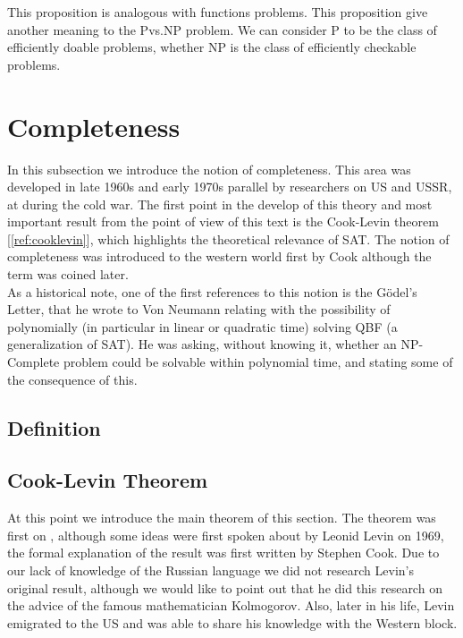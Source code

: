 This proposition is analogous with functions problems. This proposition give another meaning to the Pvs.NP problem. We can consider P to be the class of efficiently doable problems, whether NP is the class of efficiently checkable problems.




\section{Completeness}

In this subsection we introduce the notion of completeness. This area was developed in late 1960s and early 1970s parallel by researchers on US and USSR, at during the cold war. The first point in the develop of this theory and most important result from the point of view of this text is the Cook-Levin theorem [\ref{ref:cooklevin}], which highlights the theoretical relevance of SAT. The notion of completeness was introduced to the western world first by Cook \cite{cook1971complexity} although the term was coined later. \\

As a historical note, one of the first references to this notion is the Gödel's Letter\cite{hartmanis1993godel}, that he wrote to Von Neumann relating with the possibility of polynomially (in particular in linear or quadratic time) solving QBF (a generalization of SAT). He was asking, without knowing it, whether an NP-Complete problem could be solvable within polynomial time, and stating some of the consequence of this.\\



\subsection{Definition}



\subsection{Cook-Levin Theorem}
At this point we introduce the main theorem of this section. The theorem was first on \cite{cook1971complexity}, although some ideas were first spoken about by Leonid Levin on 1969, the formal explanation of the result was first written by Stephen Cook. Due to our lack of knowledge of the Russian language we did not research Levin's original result, although we would like to point out that he did this research on the advice of the famous mathematician Kolmogorov. Also, later in his life, Levin emigrated to the US and was able to share his knowledge with the Western block\cite{cvlevincook}.\\




